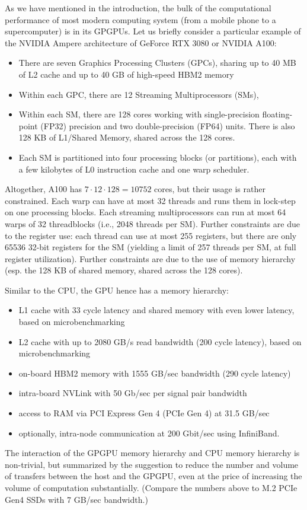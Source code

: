 As we have mentioned in the introduction, the bulk of the computational performance of most modern computing system (from a mobile phone to a supercomputer) is in its GPGPUs. Let us briefly consider a particular example of the NVIDIA Ampere architecture of GeForce RTX 3080 or NVIDIA A100:
\begin{itemize}
\item There are seven Graphics Processing Clusters (GPCs), sharing up to 40 MB of L2 cache and up to 40 GB of high-speed HBM2 memory 
\item Within each GPC, there are 12 Streaming Multiprocessors (SMs), 
\item Within each SM, there are 128 cores working with single-precision floating-point (FP32) precision and two double-precision (FP64) units. There is also 128 KB of L1/Shared Memory, shared across the 128 cores. 
\item Each SM is partitioned into four processing blocks (or partitions), each with a few kilobytes of L0 instruction cache and one warp scheduler.
\end{itemize}
Altogether, A100 has $7 \cdot 12 \cdot 128 = 10752$ cores, but their usage is rather constrained. Each warp can have at most 32 threads and runs them in lock-step on one processing blocks. Each streaming multiprocessors can run at most 64 warps of 32 threadblocks (i.e., 2048 threads per SM). Further constraints are due to the register use: each thread can use at most 255 registers, but there are only 65536 32-bit registers for the SM (yielding a limit of 257 threads per SM, at full register utilization). Further constraints are due to the use of memory hierarchy (esp. the 128 KB of shared memory, shared across the 128 cores). 


Similar to the CPU, the GPU hence has a memory hierarchy:
\begin{itemize}
\item L1 cache with 33 cycle latency and shared memory with even lower latency, based on microbenchmarking \cite{9926299} 
\item L2 cache with up to 2080 GB/s read bandwidth (200 cycle latency), based on microbenchmarking \cite{9926299} 
\item on-board HBM2 memory with 1555 GB/sec bandwidth (290 cycle latency)
\item intra-board NVLink with 50 Gb/sec per signal pair bandwidth
\item access to RAM via PCI Express Gen 4 (PCIe Gen 4) at 31.5 GB/sec
\item optionally, intra-node communication at 200 Gbit/sec using InfiniBand.
\end{itemize}
The interaction of the GPGPU memory hierarchy and CPU memory hierarchy is non-trivial, but summarized by the suggestion to reduce the number and volume of transfers between the host and the GPGPU, even at the price of increasing the volume of computation substantially. (Compare the numbers above to M.2 PCIe Gen4 SSDs with 7 GB/sec bandwidth.)

